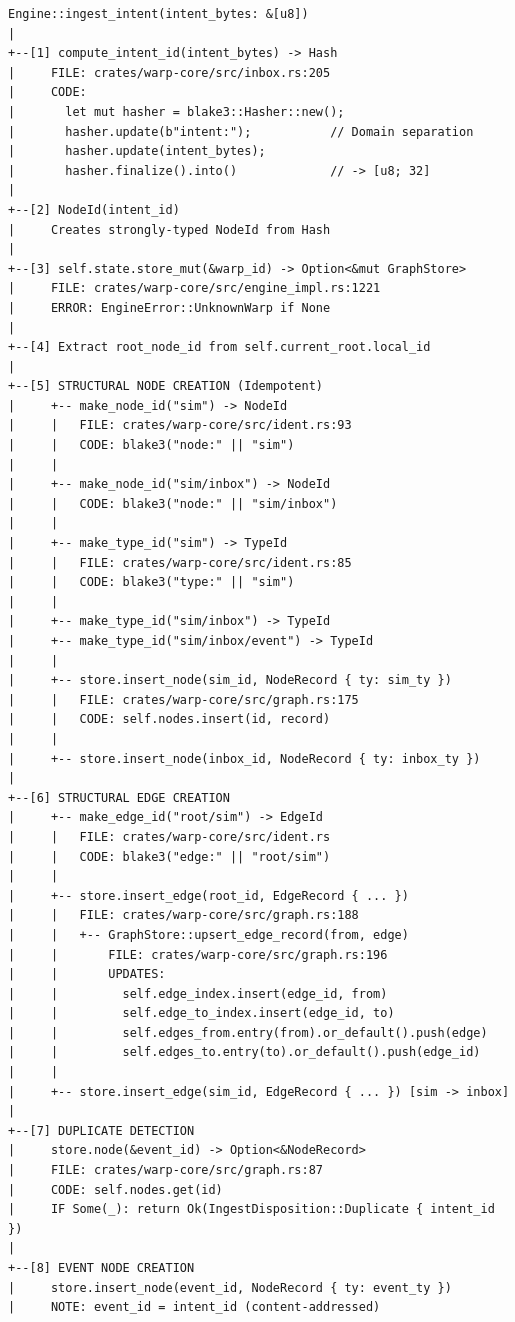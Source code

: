 \begin{lstlisting}[style=callgraph]
Engine::ingest_intent(intent_bytes: &[u8])
|
+--[1] compute_intent_id(intent_bytes) -> Hash
|     FILE: crates/warp-core/src/inbox.rs:205
|     CODE:
|       let mut hasher = blake3::Hasher::new();
|       hasher.update(b"intent:");           // Domain separation
|       hasher.update(intent_bytes);
|       hasher.finalize().into()             // -> [u8; 32]
|
+--[2] NodeId(intent_id)
|     Creates strongly-typed NodeId from Hash
|
+--[3] self.state.store_mut(&warp_id) -> Option<&mut GraphStore>
|     FILE: crates/warp-core/src/engine_impl.rs:1221
|     ERROR: EngineError::UnknownWarp if None
|
+--[4] Extract root_node_id from self.current_root.local_id
|
+--[5] STRUCTURAL NODE CREATION (Idempotent)
|     +-- make_node_id("sim") -> NodeId
|     |   FILE: crates/warp-core/src/ident.rs:93
|     |   CODE: blake3("node:" || "sim")
|     |
|     +-- make_node_id("sim/inbox") -> NodeId
|     |   CODE: blake3("node:" || "sim/inbox")
|     |
|     +-- make_type_id("sim") -> TypeId
|     |   FILE: crates/warp-core/src/ident.rs:85
|     |   CODE: blake3("type:" || "sim")
|     |
|     +-- make_type_id("sim/inbox") -> TypeId
|     +-- make_type_id("sim/inbox/event") -> TypeId
|     |
|     +-- store.insert_node(sim_id, NodeRecord { ty: sim_ty })
|     |   FILE: crates/warp-core/src/graph.rs:175
|     |   CODE: self.nodes.insert(id, record)
|     |
|     +-- store.insert_node(inbox_id, NodeRecord { ty: inbox_ty })
|
+--[6] STRUCTURAL EDGE CREATION
|     +-- make_edge_id("root/sim") -> EdgeId
|     |   FILE: crates/warp-core/src/ident.rs
|     |   CODE: blake3("edge:" || "root/sim")
|     |
|     +-- store.insert_edge(root_id, EdgeRecord { ... })
|     |   FILE: crates/warp-core/src/graph.rs:188
|     |   +-- GraphStore::upsert_edge_record(from, edge)
|     |       FILE: crates/warp-core/src/graph.rs:196
|     |       UPDATES:
|     |         self.edge_index.insert(edge_id, from)
|     |         self.edge_to_index.insert(edge_id, to)
|     |         self.edges_from.entry(from).or_default().push(edge)
|     |         self.edges_to.entry(to).or_default().push(edge_id)
|     |
|     +-- store.insert_edge(sim_id, EdgeRecord { ... }) [sim -> inbox]
|
+--[7] DUPLICATE DETECTION
|     store.node(&event_id) -> Option<&NodeRecord>
|     FILE: crates/warp-core/src/graph.rs:87
|     CODE: self.nodes.get(id)
|     IF Some(_): return Ok(IngestDisposition::Duplicate { intent_id })
|
+--[8] EVENT NODE CREATION
|     store.insert_node(event_id, NodeRecord { ty: event_ty })
|     NOTE: event_id = intent_id (content-addressed)

\end{lstlisting}
